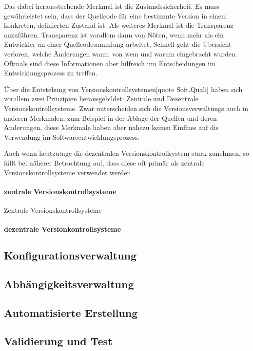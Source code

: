 \documentclass[12pt,a4paper]{book}
\begin{document}
Das dabei herausstechende Merkmal ist die Zustandssicherheit. Es muss gewährleistet sein, dass der Quellcode für eine bestimmte Version in einem konkreten, definierten Zustand ist. Als weiteres Merkmal ist die Transparenz anzuführen. Transparenz ist vorallem dann von Nöten, wenn mehr als ein Entwickler an einer Quellcodesammlung arbeitet. Schnell geht die Übersicht verloren, welche Änderungen wann, von wem und warum eingebracht wurden. Oftmals sind diese Informationen aber hilfreich um Entscheidungen im Entwicklungsprozess zu treffen.

Über die Entstehung von Versionskontrollsystemen[quote Soft.Quali] haben sich vorallem zwei Prinzipien herausgebildet: Zentrale und Dezentrale Versionskontrollsysteme. Zwar unterscheiden sich die Versionsverwaltungs auch in anderen Merkmalen, zum Beispiel in der Ablage der Quellen und deren Änderungen, diese Merkmale haben aber nahezu keinen Einfluss auf die Verwendung im Softwareentwicklungsprozess.

Auch wenn heutzutage die dezentralen Versionskontrollsystem stark zunehmen, so fällt bei näherer Betrachtung auf, dass diese oft primär als zentrale Versionskontrollsysteme verwendet werden.

\paragraph{zentrale Versionskontrollsysteme}

Zentrale Versionskontrollsysteme 

\paragraph{dezentrale Versionkontrollsysteme}
\subsection{Konfigurationsverwaltung}
\subsection{Abhängigkeitsverwaltung}
\subsection{Automatisierte Erstellung}
\subsection{Validierung und Test}
\end{document}
